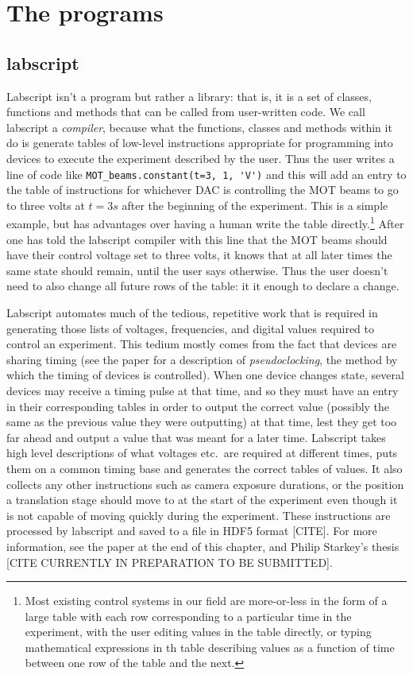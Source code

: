 \section{The programs}


\subsection{labscript}

Labscript isn't a program but rather a library: that is, it is a set of classes, functions and methods that can be called from user-written code. We call labscript a \emph{compiler}, because what the functions, classes and methods within it do is generate tables of low-level instructions appropriate for programming into devices to execute the experiment described by the user. Thus the user writes a line of code like \verb|MOT_beams.constant(t=3, 1, 'V')| and this will add an entry to the table of instructions for whichever DAC is controlling the MOT beams to go to three volts at $t = 3\unit{s}$ after the beginning of the experiment. This is a simple example, but has advantages over having a human write the table directly.\footnote{Most existing control systems in our field are more-or-less in the form of a large table with each row corresponding to a particular time in the experiment, with the user editing values in the table directly, or typing mathematical expressions in th table describing values as a function of time between one row of the table and the next.} After one has told the labscript compiler with this line that the MOT beams should have their control voltage set to three volts, it knows that at all later times the same state should remain, until the user says otherwise. Thus the user doesn't need to also change all future rows of the table: it it enough to declare a change. 

Labscript automates much of the tedious, repetitive work that is required in generating those lists of voltages, frequencies, and digital values required to control an experiment. This tedium mostly comes from the fact that devices are sharing timing (see the paper for a description of \emph{pseudoclocking}, the method by which the timing of devices is controlled). When one device changes state, several devices may receive a timing pulse at that time, and so they must have an entry in their corresponding tables in order to output the correct value (possibly the same as the previous value they were outputting) at that time, lest they get too far ahead and output a value that was meant for a later time. Labscript takes high level descriptions of what voltages etc.~are required at different times, puts them on a common timing base and generates the correct tables of values. It also collects any other instructions such as camera exposure durations, or the position a translation stage should move to at the start of the experiment even though it is not capable of moving quickly during the experiment. These instructions are processed by labscript and saved to a file in HDF5 format [CITE]. For more information, see the paper at the end of this chapter, and Philip Starkey's thesis [CITE CURRENTLY IN PREPARATION TO BE SUBMITTED].

